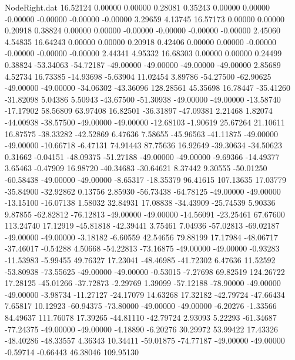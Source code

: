\begin{filecontents}{NodeRight.dat}
  16.52124    0.00000    0.00000     0.28081    0.35243    0.00000    0.00000   -0.00000   -0.00000   -0.00000   -0.00000    3.29659    4.13745
  16.57173    0.00000    0.00000     0.20918    0.38824    0.00000    0.00000   -0.00000   -0.00000   -0.00000   -0.00000    2.45060    4.54835
  16.64243    0.00000    0.00000     0.20918    0.42406    0.00000    0.00000   -0.00000   -0.00000   -0.00000   -0.00000    2.44341    4.95332
  16.68303    0.00000    0.00000     0.24499    0.38824  -53.34063  -54.72187  -49.00000  -49.00000  -49.00000  -49.00000    2.85689    4.52734
  16.73385  -14.93698   -5.63904    11.02454    3.89786  -54.27500  -62.90625  -49.00000  -49.00000  -34.06302  -43.36096  128.28561   45.35698
  16.78447  -35.41260  -31.82098     5.04386    5.50943  -43.67500  -51.30938  -49.00000  -49.00000  -13.58740  -17.17902   58.56809   63.97408
  16.82501  -36.31897  -47.09381     2.21468    1.82074  -44.00938  -38.57500  -49.00000  -49.00000  -12.68103   -1.90619   25.67264   21.10611
  16.87575  -38.33282  -42.52869     6.47636    7.58655  -45.96563  -41.11875  -49.00000  -49.00000  -10.66718   -6.47131   74.91443   87.75636
  16.92649  -39.30634  -34.50623     0.31662   -0.04151  -48.09375  -51.27188  -49.00000  -49.00000   -9.69366  -14.49377    3.65463   -0.47909
  16.98720  -40.34683  -30.64621     8.37442    9.30555  -50.01250  -60.58438  -49.00000  -49.00000   -8.65317  -18.35379   96.41615  107.13635
  17.03779  -35.84900  -32.92862     0.13756    2.85930  -56.73438  -64.78125  -49.00000  -49.00000  -13.15100  -16.07138    1.58032   32.84931
  17.08838  -34.43909  -25.74539     5.90336    9.87855  -62.82812  -76.12813  -49.00000  -49.00000  -14.56091  -23.25461   67.67600  113.24740
  17.12919  -45.81818  -42.39441     3.75461    7.04936  -57.02813  -69.02187  -49.00000  -49.00000   -3.18182   -6.60559   42.54656   79.88199
  17.17984  -48.06717  -37.46017    -0.54288    4.50668  -54.22813  -73.16875  -49.00000  -49.00000   -0.93283  -11.53983   -5.99455   49.76327
  17.23041  -48.46985  -41.72302     6.47636   11.52592  -53.80938  -73.55625  -49.00000  -49.00000   -0.53015   -7.27698   69.82519  124.26722
  17.28125  -45.01266  -37.72873    -2.29769    1.39099  -57.12188  -78.90000  -49.00000  -49.00000   -3.98734  -11.27127  -24.17079   14.63268
  17.32182  -42.79724  -47.66434     7.65817   10.12923  -60.94375  -73.80000  -49.00000  -49.00000   -6.20276   -1.33566   84.49637  111.76078
  17.39265  -44.81110  -42.79724     2.93093    5.22293  -61.34687  -77.24375  -49.00000  -49.00000   -4.18890   -6.20276   30.29972   53.99422
  17.43326  -48.40286  -48.33557     4.36343   10.34411  -59.01875  -74.77187  -49.00000  -49.00000   -0.59714   -0.66443   46.38046  109.95130

\end{filecontents}
